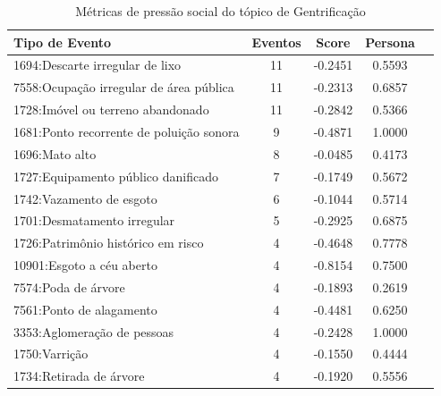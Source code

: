 \begin{table}[htbp]
	\centering
	\caption{Métricas de pressão social do tópico de Gentrificação}
	\label{tab:eventos_populares_social_gentrification}
	\begin{tabular}{|l|c|c|c|c|}
		\hline
		\textbf{Tipo de Evento}                  & \textbf{Eventos} & \textbf{Score} & \textbf{Persona} \\
		\hline
		1694:Descarte irregular de lixo          & 11               & -0.2451        & 0.5593           \\
		\hline
		7558:Ocupação irregular de área pública  & 11               & -0.2313        & 0.6857           \\
		\hline
		1728:Imóvel ou terreno abandonado        & 11               & -0.2842        & 0.5366           \\
		\hline
		1681:Ponto recorrente de poluição sonora & 9                & -0.4871        & 1.0000           \\
		\hline
		1696:Mato alto                           & 8                & -0.0485        & 0.4173           \\
		\hline
		1727:Equipamento público danificado      & 7                & -0.1749        & 0.5672           \\
		\hline
		1742:Vazamento de esgoto                 & 6                & -0.1044        & 0.5714           \\
		\hline
		1701:Desmatamento irregular              & 5                & -0.2925        & 0.6875           \\
		\hline
		1726:Patrimônio histórico em risco       & 4                & -0.4648        & 0.7778           \\
		\hline
		10901:Esgoto a céu aberto                & 4                & -0.8154        & 0.7500           \\
		\hline
		7574:Poda de árvore                      & 4                & -0.1893        & 0.2619           \\
		\hline
		7561:Ponto de alagamento                 & 4                & -0.4481        & 0.6250           \\
		\hline
		3353:Aglomeração de pessoas              & 4                & -0.2428        & 1.0000           \\
		\hline
		1750:Varrição                            & 4                & -0.1550        & 0.4444           \\
		\hline
		1734:Retirada de árvore                  & 4                & -0.1920        & 0.5556           \\

\end{tabular}
\end{table}
